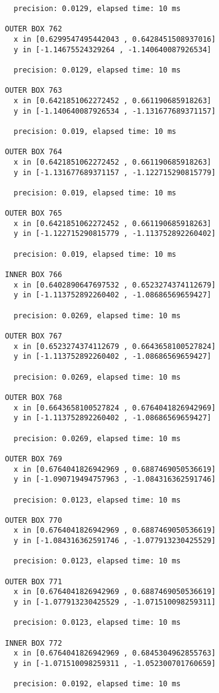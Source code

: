 \begin{verbatim}
  precision: 0.0129, elapsed time: 10 ms

OUTER BOX 762
  x in [0.6299547495442043 , 0.6428451508937016]
  y in [-1.14675524329264 , -1.140640087926534]

  precision: 0.0129, elapsed time: 10 ms

OUTER BOX 763
  x in [0.6421851062272452 , 0.661190685918263]
  y in [-1.140640087926534 , -1.131677689371157]

  precision: 0.019, elapsed time: 10 ms

OUTER BOX 764
  x in [0.6421851062272452 , 0.661190685918263]
  y in [-1.131677689371157 , -1.122715290815779]

  precision: 0.019, elapsed time: 10 ms

OUTER BOX 765
  x in [0.6421851062272452 , 0.661190685918263]
  y in [-1.122715290815779 , -1.113752892260402]

  precision: 0.019, elapsed time: 10 ms

INNER BOX 766
  x in [0.6402890647697532 , 0.6523274374112679]
  y in [-1.113752892260402 , -1.08686569659427]

  precision: 0.0269, elapsed time: 10 ms

OUTER BOX 767
  x in [0.6523274374112679 , 0.6643658100527824]
  y in [-1.113752892260402 , -1.08686569659427]

  precision: 0.0269, elapsed time: 10 ms

OUTER BOX 768
  x in [0.6643658100527824 , 0.6764041826942969]
  y in [-1.113752892260402 , -1.08686569659427]

  precision: 0.0269, elapsed time: 10 ms

OUTER BOX 769
  x in [0.6764041826942969 , 0.6887469050536619]
  y in [-1.090719494757963 , -1.084316362591746]

  precision: 0.0123, elapsed time: 10 ms

OUTER BOX 770
  x in [0.6764041826942969 , 0.6887469050536619]
  y in [-1.084316362591746 , -1.077913230425529]

  precision: 0.0123, elapsed time: 10 ms

OUTER BOX 771
  x in [0.6764041826942969 , 0.6887469050536619]
  y in [-1.077913230425529 , -1.071510098259311]

  precision: 0.0123, elapsed time: 10 ms

INNER BOX 772
  x in [0.6764041826942969 , 0.6845304962855763]
  y in [-1.071510098259311 , -1.052300701760659]

  precision: 0.0192, elapsed time: 10 ms


\end{verbatim}
